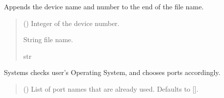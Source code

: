\documentclass[letterpaper,10pt,english]{sphinxmanual}
\begin{document}
\begin{fulllineitems}

\begin{fulllineitems}
\label{\detokenize{Setup.SetupOneDevice:Setup.SetupOneDevice.Setup_PodInterface.SetupInterface._BuildFileName}}
\pysigstartsignatures
{}
\pysigstopsignatures
\sphinxAtStartPar
Appends the device name and number to the end of the file name.
\begin{quote}\begin{description}
\sphinxAtStartPar
{} () \textendash{} Integer of the device number.

\sphinxAtStartPar
String file name.

\sphinxAtStartPar
str

\end{description}\end{quote}

\end{fulllineitems}


\begin{fulllineitems}
\label{\detokenize{Setup.SetupOneDevice:Setup.SetupOneDevice.Setup_PodInterface.SetupInterface._ChoosePort}}
\pysigstartsignatures
{}
\pysigstopsignatures
\sphinxAtStartPar
Systems checks user’s Operating System, and chooses ports accordingly.
\begin{quote}\begin{description}
\sphinxAtStartPar
{} (\sphinxstyleliteralemphasis{\sphinxupquote{{[}}}\sphinxstyleliteralemphasis{\sphinxupquote{{]}}}\sphinxstyleliteralemphasis{\sphinxupquote{, }}) \textendash{} List of port names that are already used. Defaults to {[}{]}.


\end{description}
\end{quote}
\end{fulllineitems}
\end{fulllineitems}
\end{document}
